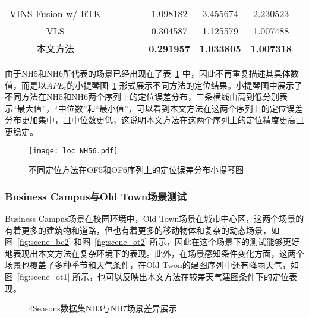 \begin{table}
\begin{tabular}{c|cccc|ccc}
VINS-Fusion w/ RTK &                                                                                &                     &                     &                     & 1.098182          & 3.455674          & 2.230523          \\
VLS                &                                                                                &                     &                     &                     & 0.304587          & 1.125579          & 1.007488          \\
本文方法               &                                                                                &                     &                     &                     & \cellcolor[HTML]{FA7F6F}\textbf{0.291957} & \cellcolor[HTML]{FA7F6F}\textbf{1.033805} & \cellcolor[HTML]{FA7F6F}\textbf{1.007318} \\ \bottomrule
\end{tabular}
\label{tab:loc_4seasons_nh2347}
\end{table}

由于NH5和NH6所代表的场景已经出现在了表~\ref{tab:loc_4seasons_nh2347} 中，因此不再重复描述其具体数值，而是以$APE_t$的小提琴图~\ref{fig:loc_4seaons_nh56} 形式展示不同方法的定位结果。小提琴图中展示了不同方法在NH5和NH6两个序列上的定位误差分布，三条横线由高到低分别表示“最大值”，“中位数”和“最小值”，可以看到本文方法在这两个序列上的定位误差分布更加集中，且中位数更低，这说明本文方法在这两个序列上的定位精度更高且更稳定。

\begin{figure}
  \centering
  \texttt{[image: loc\_NH56.pdf]}
  \caption{不同定位方法在OF5和OF6序列上的定位误差分布小提琴图}
  \label{fig:loc_4seaons_nh56}
\end{figure}

\subsubsection{Business Campus与Old Town场景测试}

Business Campus场景在校园环境中，Old Town场景在城市中心区，这两个场景的有着更多的建筑物和道路，但也有着更多的移动物体和复杂的动态场景，如图~\ref{fig:scene_bc2} 和图~\ref{fig:scene_ot2} 所示，因此在这个场景下的测试能够更好地表现出本文方法在复杂环境下的表现。此外，在场景感知条件变化方面，这两个场景也覆盖了多种季节和天气条件，在Old Twon的建图序列中还有降雨天气，如图~\ref{fig:scene_ot1} 所示，也可以反映出本文方法在较差天气建图条件下的定位表现。

\begin{figure}
  \centering
  \caption{4Seasons数据集NH3与NH7场景差异展示}
  \label{fig:scene_bcot}
\end{figure}

